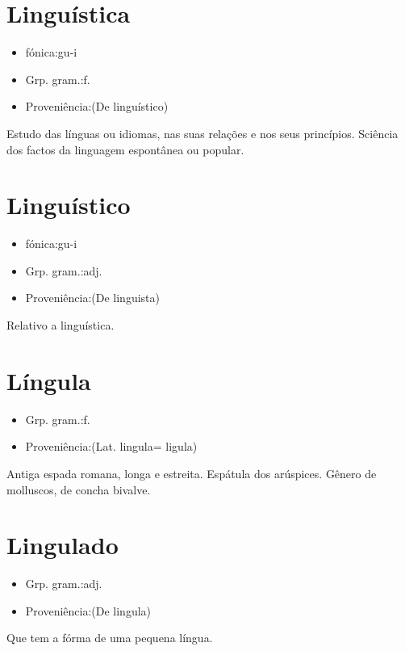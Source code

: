 \section{Linguística}
\begin{itemize}
\item {fónica:gu-i}
\end{itemize}
\begin{itemize}
\item {Grp. gram.:f.}
\end{itemize}
\begin{itemize}
\item {Proveniência:(De \textunderscore linguístico\textunderscore )}
\end{itemize}
Estudo das línguas ou idiomas, nas suas relações e nos seus princípios.
Sciência dos factos da linguagem espontânea ou popular.
\section{Linguístico}
\begin{itemize}
\item {fónica:gu-i}
\end{itemize}
\begin{itemize}
\item {Grp. gram.:adj.}
\end{itemize}
\begin{itemize}
\item {Proveniência:(De \textunderscore linguista\textunderscore )}
\end{itemize}
Relativo a linguística.
\section{Língula}
\begin{itemize}
\item {Grp. gram.:f.}
\end{itemize}
\begin{itemize}
\item {Proveniência:(Lat. \textunderscore lingula\textunderscore  = \textunderscore ligula\textunderscore )}
\end{itemize}
Antiga espada romana, longa e estreita.
Espátula dos arúspices.
Gênero de molluscos, de concha bivalve.
\section{Lingulado}
\begin{itemize}
\item {Grp. gram.:adj.}
\end{itemize}
\begin{itemize}
\item {Proveniência:(De \textunderscore lingula\textunderscore )}
\end{itemize}
Que tem a fórma de uma pequena língua.
